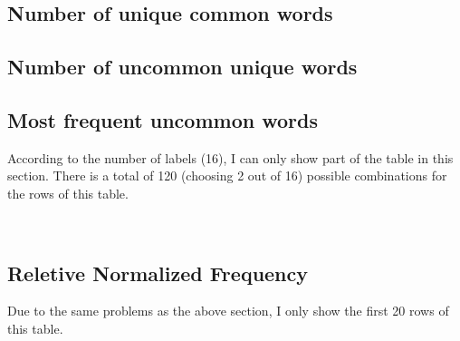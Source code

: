 \subsection{Number of unique common words}

\begin{adjustbox}{max width=\textwidth}
\end{adjustbox}



\subsection{Number of uncommon unique words}

\begin{adjustbox}{max width=\textwidth}
\end{adjustbox}

\subsection{Most frequent uncommon words}

According to the number of labels (16), I can only show part of the table in this section. There is a total of 120 (choosing 2 out of 16) possible combinations for the rows of this table.
\newline


\\


\begin{adjustbox}{max width=\textwidth}
\end{adjustbox}

\subsection{Reletive Normalized Frequency}

Due to the same problems as the above section, I only show the first 20 rows of this table.
\newline

